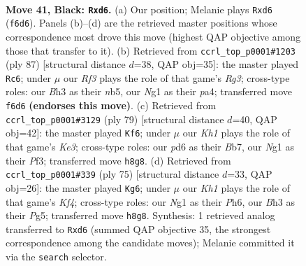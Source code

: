 \documentclass[11pt]{article}
\begin{document}
\clearpage

\begin{figure}[p]\centering
\begin{subfigure}{0.46\textwidth}\centering
\resizebox{\linewidth}{!}{%
\newchessgame
\chessboard[
  setfen={7k/R4p1p/3P1rp1/8/1p2P3/6Pb/7P/4K1nr b - - 2 41},
  showmover=false,
  pgfstyle=straightmove, color=movearrow, markmove={f6-d6}
]}
\caption{}
\end{subfigure}\hfill
\begin{subfigure}{0.46\textwidth}\centering
\resizebox{\linewidth}{!}{%
\newchessgame
\chessboard[
  setfen={7k/1R4p1/1p4rp/pN6/P4nP1/5P1P/7K/8 b - - 0 44},
  showmover=false,
  pgfstyle=straightmove, color=movearrow, markmove={g6-c6}
]}
\caption{}
\end{subfigure}
\\[4pt]
\begin{subfigure}{0.46\textwidth}\centering
\resizebox{\linewidth}{!}{%
\newchessgame
\chessboard[
  setfen={8/1b4R1/p3k3/8/Pr4p1/1P3p2/2P4P/3N1K2 b - - 1 40},
  showmover=false,
  pgfstyle=straightmove, color=movearrow, markmove={e6-f6}
]}
\caption{}
\end{subfigure}\hfill
\begin{subfigure}{0.46\textwidth}\centering
\resizebox{\linewidth}{!}{%
\newchessgame
\chessboard[
  setfen={8/p3Rp2/r6p/1p3kp1/8/P2K1P2/1P4PP/8 b - - 1 38},
  showmover=false,
  pgfstyle=straightmove, color=movearrow, markmove={f5-g6}
]}
\caption{}
\end{subfigure}
\caption{\textbf{Move 41, Black: \texttt{Rxd6}.} (a) Our position; Melanie plays \texttt{Rxd6} (\texttt{f6d6}). Panels (b)--(d) are the retrieved master positions whose correspondence most drove this move (highest QAP objective among those that transfer to it). (b) Retrieved from \texttt{ccrl\_top\_p0001\#1203} (ply 87) [structural distance $d$=38, QAP obj=35]: the master played \texttt{Rc6}; under $\mu$ our \emph{Rf3} plays the role of that game's \emph{Rg3}; cross-type roles: our \emph{B}h3 as their \emph{n}b5, our \emph{N}g1 as their \emph{p}a4; transferred move \texttt{f6d6} \textbf{(endorses this move)}. (c) Retrieved from \texttt{ccrl\_top\_p0001\#3129} (ply 79) [structural distance $d$=40, QAP obj=42]: the master played \texttt{Kf6}; under $\mu$ our \emph{Kh1} plays the role of that game's \emph{Ke3}; cross-type roles: our \emph{p}d6 as their \emph{B}b7, our \emph{N}g1 as their \emph{P}f3; transferred move \texttt{h8g8}. (d) Retrieved from \texttt{ccrl\_top\_p0001\#339} (ply 75) [structural distance $d$=33, QAP obj=26]: the master played \texttt{Kg6}; under $\mu$ our \emph{Kh1} plays the role of that game's \emph{Kf4}; cross-type roles: our \emph{N}g1 as their \emph{P}h6, our \emph{B}h3 as their \emph{P}g5; transferred move \texttt{h8g8}. Synthesis: 1 retrieved analog transferred to \texttt{Rxd6} (summed QAP objective 35, the strongest correspondence among the candidate moves); Melanie committed it via the \texttt{search} selector.}
\label{fig:thought-m81}
\end{figure}
\end{document}

